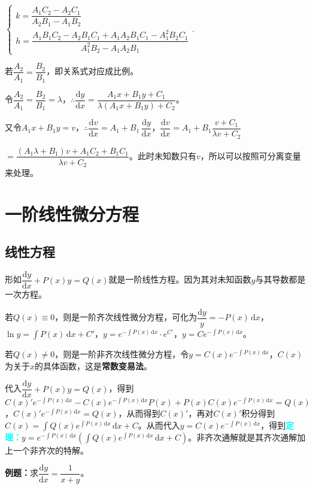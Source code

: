 \documentclass[UTF8, 12pt]{ctexart}
\begin{document}
$\left\{\begin{array}{l}
    k=\dfrac{A_1C_2-A_2C_1}{A_2B_1-A_1B_2} \\  
    h=\dfrac{A_1B_1C_2-A_2B_1C_1+A_1A_2B_1C_1-A_1^2B_2C_1}{A_1^2B_2-A_1A_2B_1}
\end{array}
\right.$.

若$\dfrac{A_2}{A_1}=\dfrac{B_2}{B_1}$，即关系式对应成比例。

令$\dfrac{A_2}{A_1}=\dfrac{B_2}{B_1}=\lambda$，$\therefore\dfrac{\textrm{d}y}{\textrm{d}x}=\dfrac{A_1x+B_1y+C_1}{\lambda(A_1x+B_1y)+C_2}$。

又令$A_1x+B_1y=v$，$\therefore\dfrac{\textrm{d}v}{\textrm{d}x}=A_1+B_1\,\dfrac{\textrm{d}y}{\textrm{d}x}$，$\dfrac{\textrm{d}v}{\textrm{d}x}=A_1+B_1\dfrac{v+C_1}{\lambda v+C_2}$

$=\dfrac{(A_1\lambda+B_1)v+A_1C_2+B_1C_1}{\lambda v+C_2}$。此时未知数只有$v$，所以可以按照可分离变量来处理。

\section{一阶线性微分方程}

\subsection{线性方程}

形如$\dfrac{\textrm{d}y}{\textrm{d}x}+P(x)y=Q(x)$就是一阶线性方程。因为其对未知函数$y$与其导数都是一次方程。

若$Q(x)\equiv 0$，则是一阶齐次线性微分方程，可化为$\dfrac{\textrm{d}y}{y}=-P(x)\,\textrm{d}x$，$\ln y=\int P(x)\,\textrm{d}x+C'$，$y=e^{-\int P(x)\,\textrm{d}x}\cdot e^{C'}$，$y=Ce^{-\int P(x)\,\textrm{d}x}$。

若$Q(x)\neq 0$，则是一阶非齐次线性微分方程，令$y=C(x)e^{-\int P(x)\,\textrm{d}x}$，$C(x)$为关于$x$的具体函数，这是\textbf{常数变易法}。

代入$\dfrac{\textrm{d}y}{\textrm{d}x}+P(x)y=Q(x)$，得到$C(x)'e^{-\int P(x)\,\textrm{d}x}-C(x)e^{-\int P(x)\,\textrm{d}x}P(x)+P(x)C(x)e^{-\int P(x)\,\textrm{d}x}=Q(x)$，$C(x)'e^{-\int P(x)\,\textrm{d}x}=Q(x)$，从而得到$C(x)'$，再对$C(x)'$积分得到$C(x)=\displaystyle{\int Q(x)e^{\int P(x)\,\textrm{d}x}\,\textrm{d}x}+C$。从而代入$y=C(x)e^{-\int P(x)\,\textrm{d}x}$，得到\textcolor{aqua}{\textbf{定理：}}$y=e^{-\int P(x)\,\textrm{d}x}(\int Q(x)e^{\int P(x)\,\textrm{d}x}\,\textrm{d}x+C)$。非齐次通解就是其齐次通解加上一个非齐次的特解。

\textbf{例题：}求$\dfrac{\textrm{d}y}{\textrm{d}x}=\dfrac{1}{x+y}$。
\end{document}

